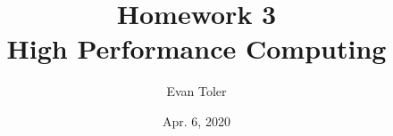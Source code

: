 



\author{Evan Toler}
\date{Apr. 6, 2020}
\title{Homework 3 \\ High Performance Computing}


\maketitle






